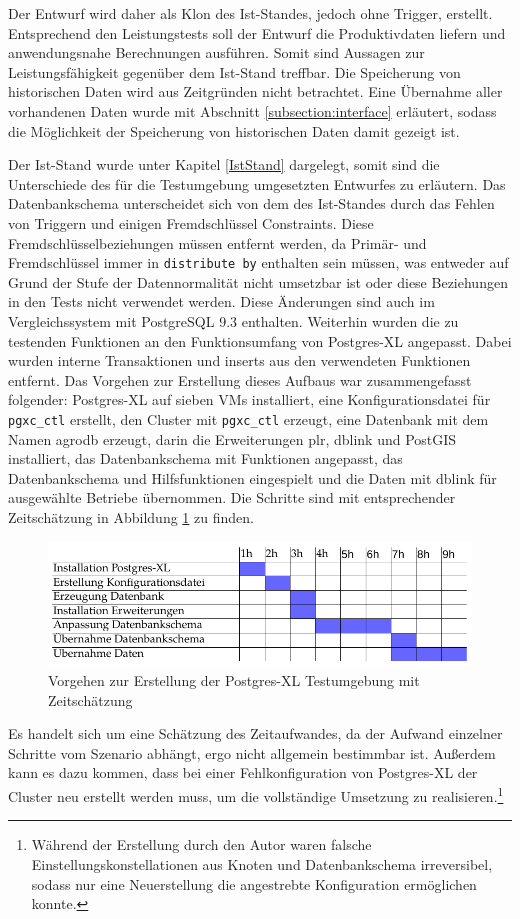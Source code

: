 Der Entwurf wird daher als Klon des Ist-Standes, jedoch ohne Trigger, erstellt.
Entsprechend den Leistungstests soll der Entwurf die Produktivdaten liefern und anwendungsnahe Berechnungen ausführen.
Somit sind Aussagen zur Leistungsfähigkeit gegenüber dem Ist-Stand treffbar.
Die Speicherung von historischen Daten wird aus Zeitgründen nicht betrachtet.
Eine Übernahme aller vorhandenen Daten wurde mit Abschnitt \ref{subsection:interface} erläutert, sodass die Möglichkeit der Speicherung von historischen Daten damit gezeigt ist.

Der Ist-Stand wurde unter Kapitel \ref{IstStand} dargelegt, somit sind die Unterschiede des für die Testumgebung umgesetzten Entwurfes zu erläutern.
Das Datenbankschema unterscheidet sich von dem des Ist-Standes durch das Fehlen von Triggern und einigen Fremdschlüssel Constraints.
Diese Fremdschlüsselbeziehungen müssen entfernt werden, da Primär- und Fremdschlüssel immer in \verb+distribute by+ enthalten sein müssen, was entweder auf Grund der Stufe der Datennormalität nicht umsetzbar ist oder diese Beziehungen in den Tests nicht verwendet werden.
Diese Änderungen sind auch im Vergleichssystem mit PostgreSQL 9.3 enthalten.
Weiterhin wurden die zu testenden Funktionen an den Funktionsumfang von Postgres-XL angepasst.
Dabei wurden interne Transaktionen und inserts aus den verwendeten Funktionen entfernt.
Das Vorgehen zur Erstellung dieses Aufbaus war zusammengefasst folgender:
Postgres-XL auf sieben VMs installiert, eine Konfigurationsdatei für \verb+pgxc_ctl+ erstellt, den Cluster mit \verb+pgxc_ctl+ erzeugt, eine Datenbank mit dem Namen agrodb erzeugt, darin die Erweiterungen plr, dblink und PostGIS installiert, das Datenbankschema mit Funktionen angepasst, das Datenbankschema und Hilfsfunktionen eingespielt und die Daten mit dblink für ausgewählte Betriebe übernommen.
Die Schritte sind mit entsprechender Zeitschätzung in Abbildung \ref{fig:getan} zu finden.
\begin{figure}[h!]
\centering
\includegraphics[width=.8\textwidth]{Abbildungen/gantt_done_cropped.pdf}
\caption[Vorgehen zur Erstellung der Postgres-XL Testumgebung]{Vorgehen zur Erstellung der Postgres-XL Testumgebung mit Zeitschätzung}
\label{fig:getan}
\end{figure}
Es handelt sich um eine Schätzung des Zeitaufwandes, da der Aufwand einzelner Schritte vom Szenario abhängt, ergo nicht allgemein bestimmbar ist.
Außerdem kann es dazu kommen, dass bei einer Fehlkonfiguration von Postgres-XL der Cluster neu erstellt werden muss, um die vollständige Umsetzung zu realisieren.\footnote{Während der Erstellung durch den Autor waren falsche Einstellungskonstellationen aus Knoten und Datenbankschema irreversibel, sodass nur eine Neuerstellung die angestrebte Konfiguration ermöglichen konnte.}

